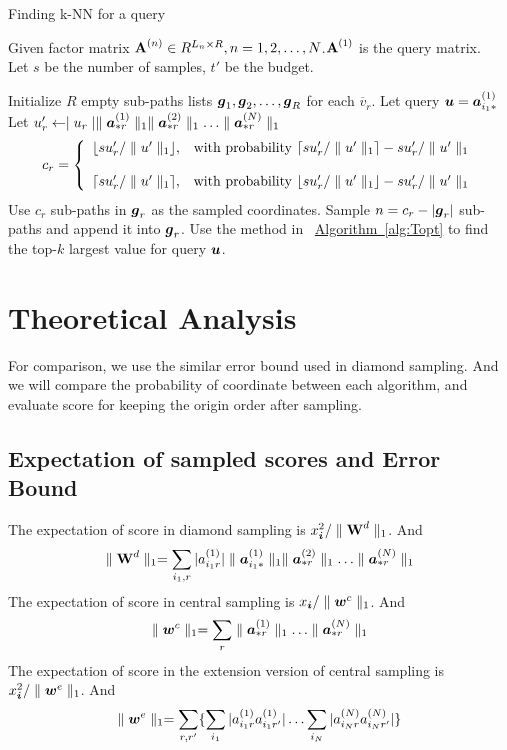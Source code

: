 \documentclass{article}
\newcommand{\Sca}[3]{{#1}^{(#2)}_{i_#2#3}}%
\newcommand{\V}[1]{{\bm{{\MakeLowercase{#1}}}}}
\newcommand{\VnC}[3]{\V{#1}^{(#2)}_{#3}}
\newcommand{\Varow}[1]{\V{a}^{(#1)}_{i_#1*}}
\newcommand{\Vacol}[1]{\V{a}^{(#1)}_{*r}}
\newcommand{\M}[1]{{\bm{\mathbf{\MakeUppercase{#1}}}}}
\newcommand{\norm}[2]{\parallel#1\parallel_{#2}}
\newcommand{\Alg}[1] {\hyperref[alg:#1] {Algorithm~\ref*{alg:#1}}}
\begin{document}
\begin{algorithm}[t]
    \caption{Finding k-NN for a query}
    \label{alg:QuerySampling}
        Given factor matrix $\M{A}^{(n)}\in R^{L_n\times R}, n = 1,2,\ldots,N$.$\M{A}^{(1)}$ is the query matrix.\\
        Let $s$ be the number of samples, $t'$ be the budget.
    \begin{algorithmic}[1]
    \State Initialize $R$ empty sub-paths lists $\V{g}_1,\V{g}_2,\ldots,\V{g}_R$ for each $\overline{v}_r$.
    \State Let query $\V{u}=\VnC{a}{1}{i_1*}$
    \State Let $u'_r \leftarrow \mid u_r\mid \norm{\Vacol{1}}{1} \norm{\Vacol{2}}{1} \ldots \norm{\Vacol{N}}{1}$
    \EndFor
    \State
    \begin{equation*}c_r=
        \left\{
          \begin{array}{ll}
            \lfloor su'_r/\norm{u'}{1} \rfloor,
            & \hbox{with probability $\lceil su'_r/\norm{u'}{1} \rceil - su'_r/\norm{u'}{1}$} \\\\
            \lceil su'_r/\norm{u'}{1} \rceil,
            & \hbox{with probability $\lfloor su'_r/\norm{u'}{1} \rfloor - su'_r/\norm{u'}{1}$}
          \end{array}
        \right.
    \end{equation*}
    \EndFor
    \If {$c_r\leq |\V{g}_r|$ }
    \State Use $c_r$ sub-paths in $\V{g}_r$ as the sampled coordinates.
    \Else
    \State Sample $n = c_r - |\V{g}_r|$ sub-paths and append it into $\V{g}_r$.
    \EndIf
    \State Use the method in ~\Alg{Topt} to find the top-$k$ largest value for query $\V{u}$.
    \EndFor
    \EndFor
    \end{algorithmic}
\end{algorithm}


\section{Theoretical Analysis}

For comparison, we use the similar error bound used in diamond sampling. And we will compare the probability of coordinate between each algorithm, and evaluate score for keeping the origin order after sampling.

\subsection{Expectation of sampled scores and Error Bound}
The expectation of score in diamond sampling is $x^2_{\V{i}}/\norm{\M{W}^d}{1}$. And
\[
\norm{\M{W}^d}{1} = \sum_{i_1,r}|\Sca{a}{1}{r}|\norm{\Varow{1}}{1} \norm{\Vacol{2}}{1} \ldots \norm{\Vacol{N}}{1}
\]
The expectation of score in central sampling is $x_{\V{i}}/\norm{\V{W}^c}{1}$. And
\[
\norm{\V{W}^c}{1} = \sum_{r}\norm{\Vacol{1}}{1}\ldots\norm{\Vacol{N}}{1}
\]
The expectation of score in the extension version of central sampling is $x_{\V{i}}^2/\norm{\V{w}^e}{1}$. And
\[
\norm{\V{w}^e}{1} = \sum_{r,r'}\{\sum_{i_1}|\Sca{a}{1}{r}\Sca{a}{1}{r'}|\ldots\sum_{i_N}|\Sca{a}{N}{r}\Sca{a}{N}{r'}|\}
\]
\end{document}
